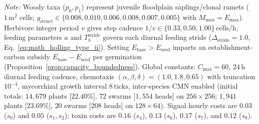 \begin{table}[b]
\raggedright\scriptsize\textit{Note:} Woody taxa ($p_0,p_1$) represent juvenile floodplain saplings/clonal ramets ($1\,\mathrm{m}^2$ cells; $g_{\mathrm{struct}} \in \{0.008, 0.010, 0.006, 0.008, 0.007, 0.005\}$ with $M_{\max}=E_{\max}$). Herbivore integer period $v$ gives step cadence $1/v \in \{0.33, 0.50, 1.00\}\,\mathrm{cells/h}$; feeding parameters $a$ and $T_h^{\mathrm{stride}}$ govern each diurnal feeding stride ($\Delta_{\mathrm{stride}} = 1.0$, Eq.~\eqref{eq:math_holling_type_ii}). Setting $E_{\mathrm{base}} > E_{\mathrm{seed}}$ imparts an establishment-carbon subsidy $E_{\mathrm{base}}-E_{\mathrm{seed}}$ per germination (Proposition~\ref{prop:capacity_boundedness}). Global constants: $C_{\max}=60$, $24\,\mathrm{h}$ diurnal feeding cadence, chemotaxis $(\alpha,\beta,\delta)=(1.0,1.8,0.65)$ with truncation $10^{-4}$, mycorrhizal growth interval $8\,\mathrm{ticks}$, inter-species CMN enabled (initial totals: $14{,}679$ plants [$22.40\%$], $72$ swarms [$1{,}554$ heads] on $256\times 256$; $1{,}941$ plants [$23.69\%$], $20$ swarms [$208$ heads] on $128\times 64$). Signal hourly costs are $0.03$ ($s_0$) and $0.05$ ($s_1, s_2$); toxin costs are $0.16$ ($s_4$), $0.13$ ($s_6$), $0.17$ ($s_7$), and $0.12$ ($s_8$).
\end{table}
